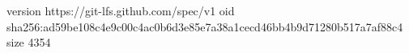 version https://git-lfs.github.com/spec/v1
oid sha256:ad59be108c4e9c00c4ac0b6d3e85e7a38a1cecd46bb4b9d71280b517a7af88c4
size 4354
